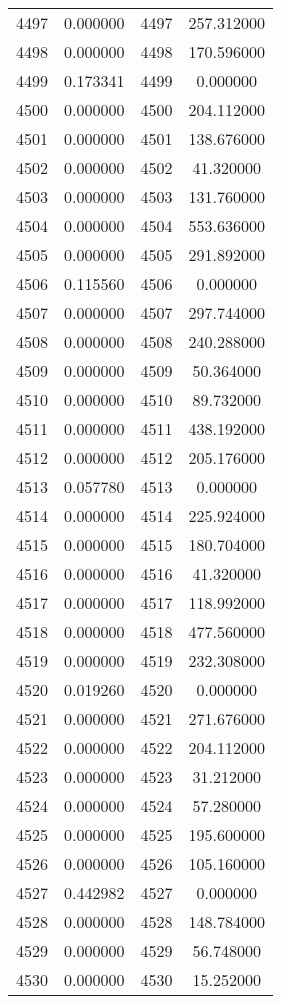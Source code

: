 \documentclass[12pt]{article}
\begin{document}
\begin{longtable}{@{}cccc@{}}
4497 & 0.000000 & 4497 & 257.312000 \\
4498 & 0.000000 & 4498 & 170.596000 \\
4499 & 0.173341 & 4499 & 0.000000 \\
4500 & 0.000000 & 4500 & 204.112000 \\
4501 & 0.000000 & 4501 & 138.676000 \\
4502 & 0.000000 & 4502 & 41.320000 \\
4503 & 0.000000 & 4503 & 131.760000 \\
4504 & 0.000000 & 4504 & 553.636000 \\
4505 & 0.000000 & 4505 & 291.892000 \\
4506 & 0.115560 & 4506 & 0.000000 \\
4507 & 0.000000 & 4507 & 297.744000 \\
4508 & 0.000000 & 4508 & 240.288000 \\
4509 & 0.000000 & 4509 & 50.364000 \\
4510 & 0.000000 & 4510 & 89.732000 \\
4511 & 0.000000 & 4511 & 438.192000 \\
4512 & 0.000000 & 4512 & 205.176000 \\
4513 & 0.057780 & 4513 & 0.000000 \\
4514 & 0.000000 & 4514 & 225.924000 \\
4515 & 0.000000 & 4515 & 180.704000 \\
4516 & 0.000000 & 4516 & 41.320000 \\
4517 & 0.000000 & 4517 & 118.992000 \\
4518 & 0.000000 & 4518 & 477.560000 \\
4519 & 0.000000 & 4519 & 232.308000 \\
4520 & 0.019260 & 4520 & 0.000000 \\
4521 & 0.000000 & 4521 & 271.676000 \\
4522 & 0.000000 & 4522 & 204.112000 \\
4523 & 0.000000 & 4523 & 31.212000 \\
4524 & 0.000000 & 4524 & 57.280000 \\
4525 & 0.000000 & 4525 & 195.600000 \\
4526 & 0.000000 & 4526 & 105.160000 \\
4527 & 0.442982 & 4527 & 0.000000 \\
4528 & 0.000000 & 4528 & 148.784000 \\
4529 & 0.000000 & 4529 & 56.748000 \\
4530 & 0.000000 & 4530 & 15.252000 \\

\end{longtable}
\end{document}
